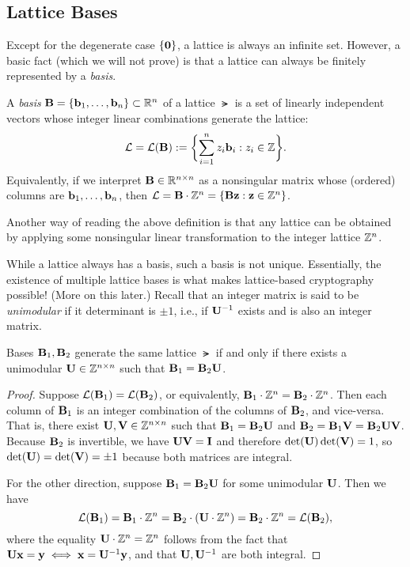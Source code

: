 \documentclass[11pt]{article}
\begin{document}
\subsection{Lattice Bases}
\label{sec:bases}

Except for the degenerate case $\{\mathbf{0}\}$, a lattice is always
an infinite set.  However, a basic fact (which we will not prove) is
that a lattice can always be finitely represented by a \emph{basis}.

\begin{definition}
  \label{def:basis}
  A \emph{basis} $\mathbf{B}=\{\mathbf{b}_1,\dots, \mathbf{b}_n\} \subset \mathbb{R}^n$ of
  a lattice $\lat$ is a set of linearly independent vectors whose
  integer linear combinations generate the lattice:
  \begin{equation}
    \label{eq:lattice-basis}
    \lat = \lat(\matB) := \set[\bigg]{\sum_{i=1}^n z_i \vecb_i : z_i\in\Z}.
  \end{equation}
  Equivalently, if we interpret $\mathbf{B} \in \mathbb{R}^{n \times n}$ as a
  nonsingular matrix whose (ordered) columns are $\mathbf{b}_1, \ldots,
  \mathbf{b}_n$, then $\mathcal{L} = \mathbf{B} \cdot \mathbb{Z}^n = \{\mathbf{B} \mathbf{z} : \mathbf{z}
    \in \mathbb{Z}^{n}\}$.
\end{definition}

Another way of reading the above definition is that any lattice can be
obtained by applying some nonsingular linear transformation to the
integer lattice $\mathbb{Z}^{n}$.

While a lattice always has a basis, such a basis is not unique.
Essentially, the existence of multiple lattice bases is what makes
lattice-based cryptography possible!  (More on this later.)  Recall
that an integer matrix is said to be \emph{unimodular} if it
determinant is $\pm 1$, i.e., if $\mathbf{U}^{-1}$ exists and is also an
integer matrix.

\begin{lemma}
  \label{lem:basis-unimod}
  Bases $\mathbf{B}_1,\mathbf{B}_2$ generate the same lattice $\lat$ if and only
  if there exists a unimodular $\mathbf{U} \in \mathbb{Z}^{n \times n}$ such that
  $\mathbf{B}_1 = \mathbf{B}_2 \mathbf{U}$.
\end{lemma}

\begin{proof}
  Suppose $\mathcal{L}(\mathbf{B}_1)=\mathcal{L}(\mathbf{B}_2)$, or equivalently, $\mathbf{B}_1
  \cdot \mathbb{Z}^n=\mathbf{B}_2 \cdot \mathbb{Z}^n$.  Then each column of $\mathbf{B}_{1}$ is
  an integer combination of the columns of $\mathbf{B}_{2}$, and
  vice-versa.  That is, there exist $\mathbf{U},\mathbf{V} \in \mathbb{Z}^{n\times n}$
  such that $\mathbf{B}_1=\mathbf{B}_2 \mathbf{U}$ and $\mathbf{B}_2=\mathbf{B}_1 \mathbf{V} =
  \mathbf{B}_{2} \mathbf{U} \mathbf{V}$.  Because $\mathbf{B}_{2}$ is invertible, we have
  $\mathbf{U} \mathbf{V}=\mathbf{I}$ and therefore $\det(\mathbf{U}) \det(\mathbf{V}) = 1$, so
  $\det(\mathbf{U}) = \det(\mathbf{V})=\pm 1$ because both matrices are integral.

  For the other direction, suppose $\mathbf{B}_1=\mathbf{B}_2 \mathbf{U}$ for some
  unimodular $\mathbf{U}$. Then we have \[ \mathcal{L}(\mathbf{B}_1)=\mathbf{B}_1 \cdot \mathbb{Z}^n
  = \mathbf{B}_2 \cdot (\mathbf{U} \cdot \mathbb{Z}^n) = \mathbf{B}_2 \cdot \mathbb{Z}^n =
  \mathcal{L}(\mathbf{B}_{2}), \] where the equality $\mathbf{U} \cdot \mathbb{Z}^{n} = \mathbb{Z}^{n}$
  follows from the fact that $\mathbf{U} \mathbf{x} = \mathbf{y} \iff \mathbf{x} =
  \mathbf{U}^{-1} \mathbf{y}$, and that $\mathbf{U}, \mathbf{U}^{-1}$ are both integral.
\end{proof}
\end{document}
